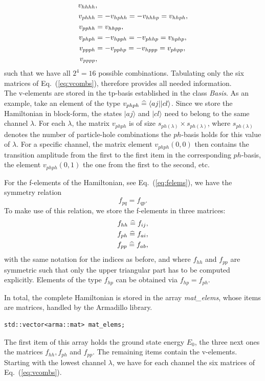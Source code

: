 \begin{align}
v_{hhhh} &, \notag \\
v_{phhh} &= -v_{hphh} = -v_{hhhp} = v_{hhph}, \notag \\
v_{pphh} &= v_{hhpp}, \notag \\
v_{phph} &= -v_{hpph} = -v_{phhp} = v_{hphp}, \notag \\
v_{ppph} &= -v_{pphp} = -v_{hppp} = v_{phpp}, \notag \\
v_{pppp} &,
\label{eq:vsyms}
\end{align}
such that we have all $2^4=16$ possible combinations. Tabulating only the six matrices of Eq.~(\ref{eq:vcombs}), therefore provides all needed information.\\
The v-elements are stored in the tp-basis established in the class \textit{Basis}. As an example, take an element of the type $v_{phph} \mathrel{\widehat{=}} \langle a j |  | c l \rangle$. Since we store the Hamiltonian in block-form, the states $| a j\rangle$ and $|c l \rangle$ need to belong to the same channel $\lambda$. For each $\lambda$, the matrix $v_{phph}$ is of size $s_{ph(\lambda)}\times s_{ph(\lambda)}$, where $s_{ph(\lambda)}$ denotes the number of particle-hole combinations the $ph$-basis holds for this value of  $\lambda$. For a specific channel, the matrix element $v_{phph}(0,0)$ then contains the transition amplitude from the first to the first item in the corresponding $ph$-basis, the element $v_{phph}(0,1)$ the one from the first to the second, etc. 

For the f-elements of the Hamiltonian, see Eq.~(\ref{eq:felems}), we have the symmetry relation
\[
f_{pq} = f_{qp}.
\] 
To make use of this relation, we store the f-elements in three matrices:
\begin{align}
f_{hh} \mathrel{\widehat{=}} f_{ij}, \notag \\
f_{ph} \mathrel{\widehat{=}} f_{ai}, \notag \\
f_{pp} \mathrel{\widehat{=}} f_{ab},
\end{align}
with the same notation for the indices as before, and where $f_{hh}$ and $f_{pp}$ are symmetric such that only the upper triangular part has to be computed explicitly. Elements of the type $f_{hp}$ can be obtained via $f_{hp} = f_{ph}$.

In total, the complete Hamiltonian is stored in the array \textit{mat\_elems}, whose items are matrices, handled by the Armadillo library.
\begin{lstlisting}[backgroundcolor=\color{lighter-gray},numbers=none]
std::vector<arma::mat> mat_elems;
\end{lstlisting}
The first item of this array holds the ground state energy $E_0$, the three next ones the matrices $f_{hh}, f_{ph}$ and $f_{pp}$. The remaining items contain the v-elements. Starting with the lowest channel $\lambda$, we have for each channel the six matrices of Eq.~(\ref{eq:vcombs}).\\

